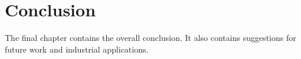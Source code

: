 \chapter{Conclusion}
\label{cha:conclusion}
The final chapter contains the overall conclusion. It also contains
suggestions for future work and industrial applications.


